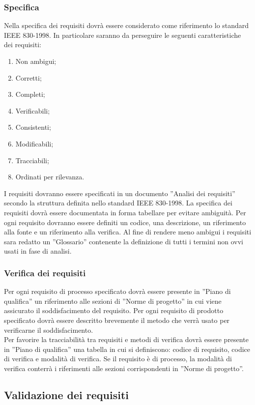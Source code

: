 {{			\subsubsection{Specifica}{
				Nella specifica dei requisiti dovrà essere considerato come riferimento lo standard IEEE 830-1998. In particolare saranno da perseguire le seguenti caratteristiche dei requisiti:
				\begin{enumerate}
					\item Non ambigui;
					\item Corretti;
					\item Completi;
					\item Verificabili;
					\item Consistenti;
					\item Modificabili;
					\item Tracciabili;
					\item Ordinati per rilevanza.
				\end{enumerate}
				I requisiti dovranno essere specificati in un documento ”Analisi dei requisiti” secondo la struttura definita nello standard IEEE 830-1998. La specifica dei requisiti dovrà essere documentata in forma tabellare per evitare ambiguità. Per ogni requisito dovranno essere definiti un codice, una descrizione, un riferimento alla fonte e un riferimento alla verifica. Al fine di rendere meno ambigui i requisiti sara redatto un ”Glossario” contenente la definizione di tutti i termini non ovvi usati in fase di analisi.
			}
			\subsubsection{Verifica dei requisiti}{
				Per ogni requisito\ped{g} di processo specificato dovrà essere presente in ”Piano di qualifica” un riferimento alle sezioni di ”Norme di progetto” in cui viene assicurato il soddisfacimento del requisito. Per ogni requisito di prodotto specificato dovrà essere descritto brevemente il metodo che verrà usato per verificarne il soddisfacimento.\\Per favorire la tracciabilità tra requisiti e metodi di verifica dovrà essere presente in ”Piano di qualifica” una tabella in cui si definiscono: codice\ped{g} di requisito, codice di verifica e modalità di verifica. Se il requisito\ped{g} è di processo, la modalità di verifica conterrà i riferimenti alle sezioni corrispondenti in ”Norme di progetto”.
			}
		}
		\subsection{Validazione dei requisiti}{
}}
